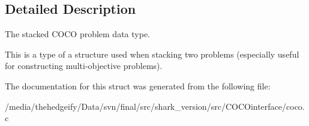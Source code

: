 \subsection{Detailed Description}
The stacked C\+O\+CO problem data type. 

This is a type of a structure used when stacking two problems (especially useful for constructing multi-\/objective problems). 

The documentation for this struct was generated from the following file\+:\begin{DoxyCompactItemize}
\item 
/media/thehedgeify/\+Data/svn/final/src/shark\+\_\+version/src/\+C\+O\+C\+Ointerface/coco.\+c\end{DoxyCompactItemize}
